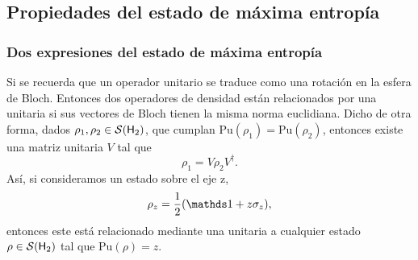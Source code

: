 \subsection{Propiedades del estado de máxima entropía}

\subsubsection{Dos expresiones del estado de máxima entropía}


Si se recuerda que un operador unitario se traduce como una rotación en la esfera de Bloch. Entonces dos operadores de densidad están relacionados por una unitaria si sus vectores de Bloch tienen la misma norma euclidiana. Dicho de otra forma, dados $\rho_{1},\rho_{2}\in\mathcal{S}({\sf H}_{2})$, que cumplan $\text{Pu}(\rho_{1})=\text{Pu}(\rho_{2})$, entonces existe una matriz unitaria $V$ tal que
\begin{equation}
    \rho_{1}=V\rho_{2}V^{\dag}.
\end{equation}
Así, si consideramos un estado sobre el eje z,
\begin{equation}\label{eq:rhoz}
\rho_{z}=\frac{1}{2}\qty(\Id+z\sigma_{z}),
\end{equation}
entonces este está relacionado mediante una unitaria a cualquier estado $\rho\in\mathcal{S}({\sf H}_2)$ tal que $\text{Pu}(\rho)=z$.

